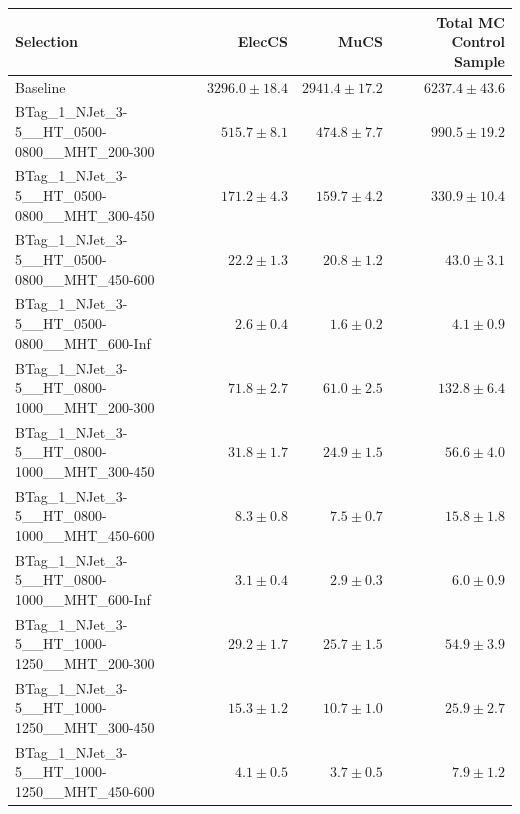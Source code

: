 \documentclass{beamer}
\begin{document}
\begin{frame}
\tiny
\begin{tabular}{lrrr}
\toprule

                                                Selection  &                   ElecCS  &                     MuCS  &          Total MC Control Sample  \\
\midrule
                                             Baseline &           $3296.0\pm18.4$&           $2941.4\pm17.2$&               $6237.4\pm43.6$ \\
      BTag\_1\_NJet\_3-5\_\_HT\_0500-0800\_\_MHT\_200-300 &             $515.7\pm8.1$&             $474.8\pm7.7$&                $990.5\pm19.2$ \\
      BTag\_1\_NJet\_3-5\_\_HT\_0500-0800\_\_MHT\_300-450 &             $171.2\pm4.3$&             $159.7\pm4.2$&                $330.9\pm10.4$ \\
      BTag\_1\_NJet\_3-5\_\_HT\_0500-0800\_\_MHT\_450-600 &              $22.2\pm1.3$&              $20.8\pm1.2$&                  $43.0\pm3.1$ \\
      BTag\_1\_NJet\_3-5\_\_HT\_0500-0800\_\_MHT\_600-Inf &               $2.6\pm0.4$&               $1.6\pm0.2$&                   $4.1\pm0.9$ \\
      BTag\_1\_NJet\_3-5\_\_HT\_0800-1000\_\_MHT\_200-300 &              $71.8\pm2.7$&              $61.0\pm2.5$&                 $132.8\pm6.4$ \\
      BTag\_1\_NJet\_3-5\_\_HT\_0800-1000\_\_MHT\_300-450 &              $31.8\pm1.7$&              $24.9\pm1.5$&                  $56.6\pm4.0$ \\
      BTag\_1\_NJet\_3-5\_\_HT\_0800-1000\_\_MHT\_450-600 &               $8.3\pm0.8$&               $7.5\pm0.7$&                  $15.8\pm1.8$ \\
      BTag\_1\_NJet\_3-5\_\_HT\_0800-1000\_\_MHT\_600-Inf &               $3.1\pm0.4$&               $2.9\pm0.3$&                   $6.0\pm0.9$ \\
      BTag\_1\_NJet\_3-5\_\_HT\_1000-1250\_\_MHT\_200-300 &              $29.2\pm1.7$&              $25.7\pm1.5$&                  $54.9\pm3.9$ \\
      BTag\_1\_NJet\_3-5\_\_HT\_1000-1250\_\_MHT\_300-450 &              $15.3\pm1.2$&              $10.7\pm1.0$&                  $25.9\pm2.7$ \\
      BTag\_1\_NJet\_3-5\_\_HT\_1000-1250\_\_MHT\_450-600 &               $4.1\pm0.5$&               $3.7\pm0.5$&                   $7.9\pm1.2$ \\

\end{tabular}
\end{frame}
\end{document}
